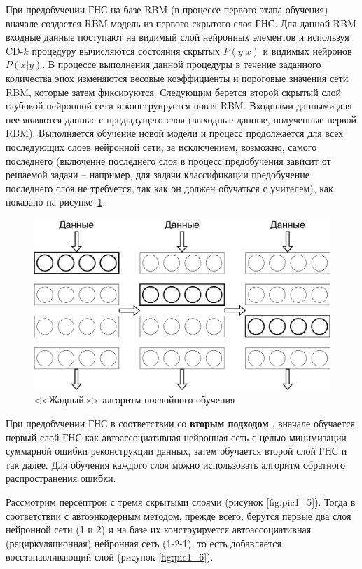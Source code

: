 При предобучении ГНС на базе RBM (в процессе первого этапа обучения) вначале создается RBM-модель из первого скрытого слоя ГНС. Для данной RBM входные данные поступают на видимый слой нейронных элементов и используя CD-$k$ процедуру вычисляются состояния скрытых $P(y \lvert x)$ и видимых нейронов $P(x \lvert y)$. В процессе выполнения данной процедуры в течение заданного количества эпох изменяются весовые коэффициенты и пороговые значения сети RBM, которые затем фиксируются. Следующим берется второй скрытый слой глубокой нейронной сети и конструируется новая RBM. Входными данными для нее являются данные с предыдущего слоя (выходные данные, полученные первой RBM). Выполняется обучение новой модели и процесс продолжается для всех последующих слоев нейронной сети, за исключением, возможно, самого последнего (включение последнего слоя в процесс предобучения зависит от решаемой задачи -- например, для задачи классификации предобучение последнего слоя не требуется, так как он должен обучаться с учителем), как показано на рисунке~\ref{fig:pic1_4}. 

\begin{figure}[H]
  \centering
  \includegraphics[width=\textwidth]{man-source/images/ch1/pic1-4.png}
  \caption{<<Жадный>> алгоритм послойного обучения}
  \label{fig:pic1_4}
\end{figure}

При предобучении ГНС в соответствии со \textbf{вторым подходом} \cite{n6}, вначале обучается первый слой ГНС как автоассоциативная нейронная сеть с целью минимизации суммарной ошибки реконструкции данных, затем обучается второй слой ГНС и так далее. Для обучения каждого слоя можно использовать алгоритм обратного распространения ошибки. 
	
Рассмотрим персептрон с тремя скрытыми слоями (рисунок \ref{fig:pic1_5}). Тогда в соответствии с автоэнкодерным методом, прежде всего, берутся первые два слоя нейронной сети (1 и 2) и на базе их конструируется автоассоциативная (рециркуляционная) нейронная сеть (1-2-1), то есть добавляется восстанавливающий слой (рисунок \ref{fig:pic1_6}). 
	
